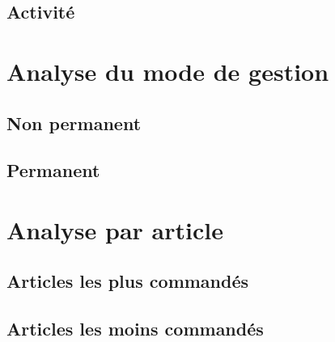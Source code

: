 \documentclass{beamer}
\begin{document}
    \subsection{Activité}

    \begin{frame}
    \end{frame}

    \section{Analyse du mode de gestion}
    \subsection{Non permanent}

    \begin{frame}
    \end{frame}

    \subsection{Permanent}

    \begin{frame}
    \end{frame}

    \section{Analyse par article}
    \subsection{Articles les plus commandés}

    \begin{frame}
    \end{frame}

    \subsection{Articles les moins commandés}

    \begin{frame}
    \end{frame}
\end{document}
